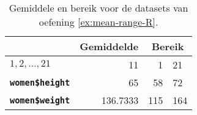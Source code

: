 \begin{table}
  \centering
  \begin{tabular}{@{}l|r|rl@{}}
    \toprule
      & \textbf{Gemiddelde} & \multicolumn{2}{c}{\textbf{Bereik}} \\
    \midrule                
                  \textbf{$1,2,...,21$} & 11       & 1    & 21    \\ 
        \textbf{\texttt{women\$height}} & 65       & 58   & 72    \\
        \textbf{\texttt{women\$weight}} & 136.7333 & 115  & 164   \\
    \bottomrule
  \end{tabular}
  \caption{Gemiddele en bereik voor de datasets van oefening \ref{ex:mean-range-R}.}
  \label{tab:opl-mean-range-R}
\end{table}
